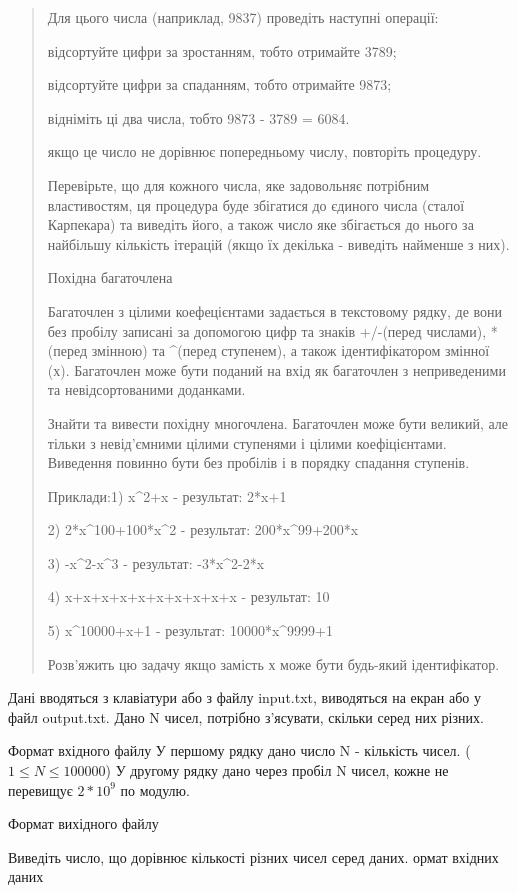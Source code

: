 \documentclass[]{article}
\begin{document}
\begin{quote}
Для цього числа (наприклад, 9837) проведіть наступні операції:

відсортуйте цифри за зростанням, тобто отримайте 3789;

відсортуйте цифри за спаданням, тобто отримайте 9873;

відніміть ці два числа, тобто 9873 - 3789 = 6084.

якщо це число не дорівнює попередньому числу, повторіть процедуру.

Перевірьте, що для кожного числа, яке задовольняє потрібним
властивостям, ця процедура буде збігатися до єдиного числа (сталої
Карпекара) та виведіть його, а також число яке збігається до нього за
найбільшу кількість ітерацій (якщо їх декілька - виведіть найменше з
них).

Похідна багаточлена

Багаточлен з цілими коефецієнтами задається в текстовому рядку, де вони
без пробілу записані за допомогою цифр та знаків +/-(перед числами),
*(перед змінною) та \^{}(перед ступенем), а також ідентифікатором
змінної (х). Багаточлен може бути поданий на вхід як багаточлен з
неприведеними та невідсортованими доданками.

Знайти та вивести похідну многочлена. Багаточлен може бути великий, але
тільки з невід'ємними цілими ступенями і цілими коефіцієнтами. Виведення
повинно бути без пробілів і в порядку спадання ступенів.

Приклади:1) x\^{}2+x - результат: 2*x+1

2) 2*x\^{}100+100*x\^{}2 - результат: 200*x\^{}99+200*x

3) -x\^{}2-x\^{}3 - результат: -3*x\^{}2-2*x

4) x+x+x+x+x+x+x+x+x+x - результат: 10

5) x\^{}10000+x+1 - результат: 10000*x\^{}9999+1

Розв'яжить цю задачу якщо замість х може бути будь-який ідентифікатор.
\end{quote}


Дані вводяться з клавіатури або з файлу input.txt, виводяться на екран або у файл output.txt.
 Дано N чисел, потрібно з'ясувати, скільки серед них різних.

Формат вхідного файлу
У першому рядку дано число N - кількість чисел. ($1 \le N \le 100000$)
У другому рядку дано через пробіл N чисел, кожне не перевищує $2 * 10^9$ по модулю.


Формат вихідного файлу

Виведіть число, що дорівнює кількості різних чисел серед даних.
ормат вхідних даних
\end{document}
